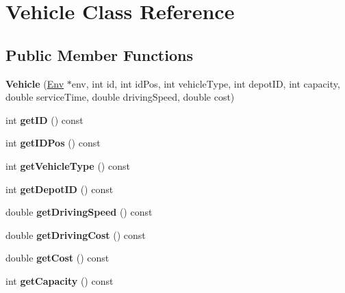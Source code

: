 \hypertarget{class_vehicle}{}\section{Vehicle Class Reference}
\label{class_vehicle}
\subsection*{Public Member Functions}
\begin{DoxyCompactItemize}
\item 
\mbox{\label{class_vehicle_a5d6fef3888569a2f29ecb0027529592e}} 
{\bfseries Vehicle} (\hyperlink{class_env}{Env} $\ast$env, int id, int id\+Pos, int vehicle\+Type, int depot\+ID, int capacity, double service\+Time, double driving\+Speed, double cost)
\item 
\mbox{\label{class_vehicle_acea04d455b93f807dabbe850799636c4}} 
int {\bfseries get\+ID} () const
\item 
\mbox{\label{class_vehicle_a3c0ba62b556694de7519910ff7c222b0}} 
int {\bfseries get\+I\+D\+Pos} () const
\item 
\mbox{\label{class_vehicle_a6d561e79b80d8335c2b1d61b0a00ab55}} 
int {\bfseries get\+Vehicle\+Type} () const
\item 
\mbox{\label{class_vehicle_a0952f9b75d0ff8df66e33e60521e0dc0}} 
int {\bfseries get\+Depot\+ID} () const
\item 
\mbox{\label{class_vehicle_ac42193823beeb27ad51a8d78a541f970}} 
double {\bfseries get\+Driving\+Speed} () const
\item 
\mbox{\label{class_vehicle_af242c980b1bfbc56d27ae4184c0f32c9}} 
double {\bfseries get\+Driving\+Cost} () const
\item 
\mbox{\label{class_vehicle_a095c19748573c646c3eaf12581e4d969}} 
double {\bfseries get\+Cost} () const
\item 
\mbox{\label{class_vehicle_ac1c0f2280c871eabc659e83e4d18252f}} 
int {\bfseries get\+Capacity} () const
\item 

\end{DoxyCompactItemize}
